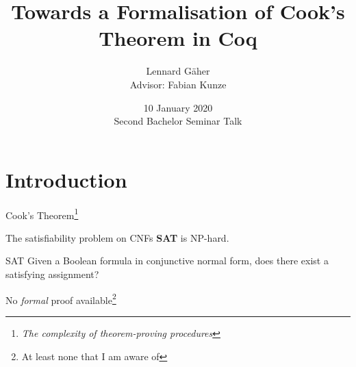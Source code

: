 \documentclass[11pt,usenames,dvipsnames,
hyperref={pdfencoding=auto,psdextra}]{beamer}
\title{Towards a Formalisation of Cook's Theorem in Coq}
\institute{Saarland University}
\date{10 January 2020\\[1ex]Second Bachelor Seminar Talk}
\author{Lennard Gäher\\[1mm] {\small{Advisor: Fabian Kunze}}}
\let\otp\titlepage
\renewcommand{\titlepage}{\otp\addtocounter{framenumber}{-1}}
\newcommand*{\sat}{\textbf{SAT}}
\begin{document}
\begin{frame}[plain]
  \titlepage
\end{frame}

\section{Introduction}

\begin{frame}{Cook's Theorem\footnote{\emph{The complexity of theorem-proving procedures}\cite{Cook:1971:CTP:800157.805047}}}

  \begin{block}{\vspace*{-3ex}}
    The satisfiability problem on CNFs \sat{} is NP-hard.
  \end{block}
  \vspace{3ex}
  \begin{block}{SAT}
    Given a Boolean formula in conjunctive normal form, does there exist a satisfying assignment?
  \end{block}

  \vspace{3ex}
  \begin{center}
    No \emph{formal} proof available\footnote{At least none that I am aware of}
  \end{center}
\end{frame}
\end{document}
